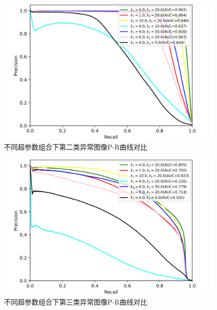 \begin{figure}[H]
	\centering
	\includegraphics[width=1.0\textwidth]{figure/pr_curve_multi_skin_hyper_paras/SKIN_pr_curve.png}
	\caption{不同超参数组合下第二类异常图像P-R曲线对比}
	\label{fig:multi_simulate_pr_curve_skin_hyper_paras}
\end{figure}
\begin{figure}[H]
	\centering
	\includegraphics[width=1.0\textwidth]{figure/pr_curve_multi_skin_hyper_paras/CIRCLE_pr_curve.png}
	\caption{不同超参数组合下第三类异常图像P-R曲线对比} 
	\label{fig:multi_simulate_pr_curve_circle_hyper_paras}
\end{figure}

